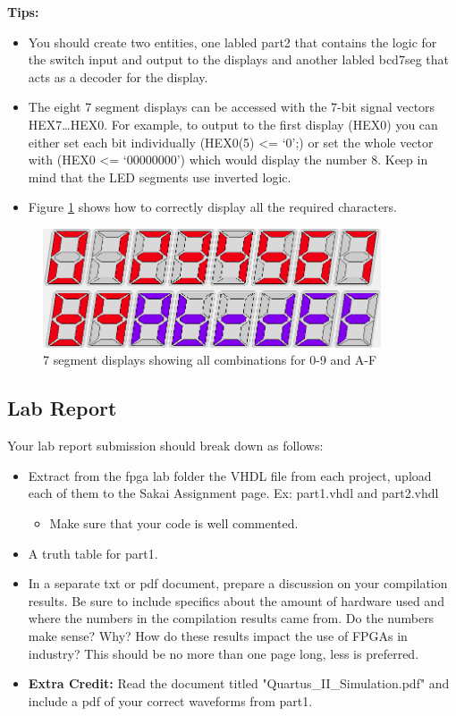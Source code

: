 {\bf Tips:} 
\begin{itemize}
	\item You should create two entities, one labled part2 that contains the logic for the switch input and output to the displays and another labled bcd7seg that acts as a decoder for the display.
	
	\item The eight 7 segment displays can be accessed with the 7-bit signal vectors HEX7\ldots HEX0. For example, to output to the first display (HEX0) you can either set each bit individually (HEX0(5) <= `0';) or set the whole vector with (HEX0 <= `00000000') which would display the number 8. Keep in mind that the LED segments use inverted logic.
	  
	\item Figure \ref{fig:7segreference} shows how to correctly display all the required characters.
\end{itemize}

\begin{figure}[H]
	\centering
	\includegraphics[width=100mm]{Lab1/figures/7segreference.png}
	\caption{7 segment displays showing all combinations for 0-9 and A-F}
	\label{fig:7segreference}
\end{figure}

\subsection{Lab Report}
Your lab report submission should break down as follows:
\begin{itemize}
	\item Extract from the fpga lab folder the VHDL file from each project, upload each of them to the Sakai Assignment page. Ex: part1.vhdl and 				part2.vhdl
	\begin{itemize}
		\item Make sure that your code is well commented.
	\end{itemize}
	\item A truth table for part1.
	\item In a separate txt or pdf document, prepare a discussion on your compilation results. Be sure to include specifics about the amount of 					hardware used and where the numbers in the compilation results came from. Do the numbers make sense? Why? How do these 				results impact the use of FPGAs in industry? This should be no more than one page long, less is preferred.
	\item {\bf Extra Credit: }Read the document titled "Quartus\_II\_Simulation.pdf" and include a pdf of your correct waveforms from part1.
\end{itemize}

